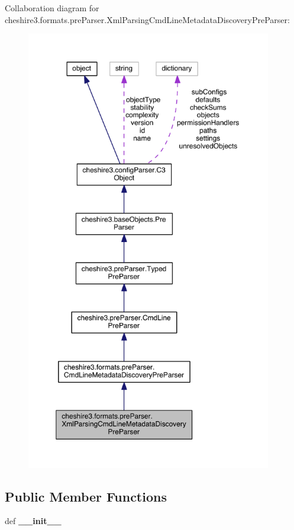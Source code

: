 Collaboration diagram for cheshire3.\-formats.\-pre\-Parser.\-Xml\-Parsing\-Cmd\-Line\-Metadata\-Discovery\-Pre\-Parser\-:
\nopagebreak
\begin{figure}[H]
\begin{center}
\leavevmode
\includegraphics[height=550pt]{classcheshire3_1_1formats_1_1pre_parser_1_1_xml_parsing_cmd_line_metadata_discovery_pre_parser__coll__graph}
\end{center}
\end{figure}
\subsection*{Public Member Functions}
\begin{DoxyCompactItemize}
\item 
\hypertarget{classcheshire3_1_1formats_1_1pre_parser_1_1_xml_parsing_cmd_line_metadata_discovery_pre_parser_a59adcb972e1184b1cbbe5c2e09101554}{def {\bfseries \-\_\-\-\_\-init\-\_\-\-\_\-}}\label{classcheshire3_1_1formats_1_1pre_parser_1_1_xml_parsing_cmd_line_metadata_discovery_pre_parser_a59adcb972e1184b1cbbe5c2e09101554}

\end{DoxyCompactItemize}
